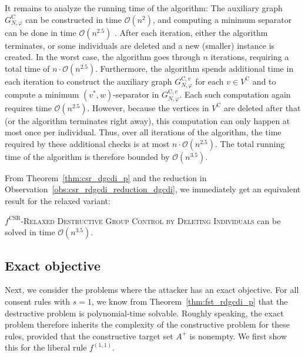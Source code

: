 \documentclass[
    12pt,               %
    a4paper,            %
    bibtotoc,           %
    pointlessnumbers,   %
    ngerman,            %
    titlepage,          %
    leqno,              %
    ]{scrarticle}       %
\newcommand\thmref{Theorem~\ref}
\newcommand\obsref{Observation~\ref}
\begin{document}
\begin{Proof}
It remains to analyze the running time of the algorithm: The auxiliary graph $G_{N, \varphi}^{\text{C}}$ can be constructed in time $\mathcal{O}(n^2)$, and computing a minimum separator can be done in time $\mathcal{O}(n^{2.5})$ \cite{E75,ET75}. After each iteration, either the algorithm terminates, or some individuals are deleted and a new (smaller) instance is created. In the worst case, the algorithm goes through $n$ iterations, requiring a total time of $n \cdot \mathcal{O}(n^{2.5})$. Furthermore, the algorithm spends additional time in each iteration to construct the auxiliary graph $G_{N, \varphi}^{\text{C}, v}$ for each $v \in V^{\text{C}}$ and to compute a minimum $(v^\ast, w)$-separator in $G_{N, \varphi}^{\text{C}, v}$. Each such computation again requires time $\mathcal{O}(n^{2.5})$. However, because the vertices in $V^{\text{C}}$ are deleted after that (or the algorithm terminates right away), this computation can only happen at most once per individual. Thus, over all iterations of the algorithm, the time required by these additional checks is at most $n \cdot \mathcal{O}(n^{2.5})$. The total running time of the algorithm is therefore bounded by $\mathcal{O}(n^{3.5})$.
\end{Proof}



From \thmref{thm:csr_dgcdi_p} and the reduction in \obsref{obs:csr_rdgcdi_reduction_dgcdi}, we immediately get an equivalent result for the relaxed variant:

\begin{Corollary} \label{cor:csr_rdgcdi_p}
$f^{\text{CSR}}$-\textsc{Relaxed Destructive Group Control by Deleting Individuals} can be solved in time $\mathcal{O}(n^{3.5})$.
\end{Corollary}



\clearpage

\subsection{Exact objective}

Next, we consider the problems where the attacker has an exact objective. For all consent rules with $s=1$, we know from \thmref{thm:fst_rdgcdi_p} that the destructive problem is polynomial-time solvable. Roughly speaking, the exact problem therefore inherits the complexity of the constructive problem for these rules, provided that the constructive target set $A^+$ is nonempty. We first show this for the liberal rule $f^{(1, 1)}$.
\end{document}
